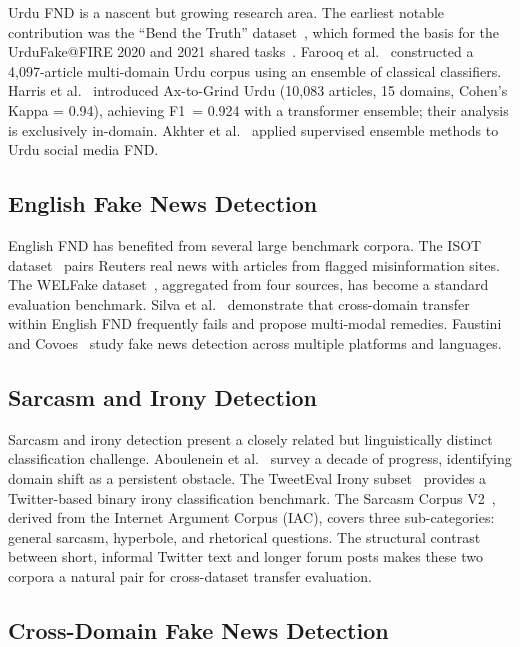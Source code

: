 \documentclass[conference]{IEEEtran}
\begin{document}
Urdu FND is a nascent but growing research area. The earliest notable
contribution was the ``Bend the Truth'' dataset~\cite{amjad2020bend},
which formed the basis for the UrduFake@FIRE 2020 and 2021 shared
tasks~\cite{amjad2020fire,amjad2022fire}. Farooq et
al.~\cite{farooq2023fake} constructed a 4,097-article multi-domain
Urdu corpus using an ensemble of classical classifiers. Harris et
al.~\cite{harris2024axtogrind} introduced Ax-to-Grind Urdu (10,083
articles, 15 domains, Cohen's Kappa = 0.94), achieving F1~= 0.924
with a transformer ensemble; their analysis is exclusively in-domain.
Akhter et al.~\cite{akhter2021supervised} applied supervised ensemble
methods to Urdu social media FND.

\subsection{English Fake News Detection}

English FND has benefited from several large benchmark corpora. The
ISOT dataset~\cite{ahmed2018isot} pairs Reuters real news with articles
from flagged misinformation sites. The WELFake
dataset~\cite{verma2021welfake}, aggregated from four sources, has
become a standard evaluation benchmark. Silva et
al.~\cite{silva2021embracing} demonstrate that cross-domain transfer
within English FND frequently fails and propose multi-modal remedies.
Faustini and Covoes~\cite{faustini2020fake} study fake news detection
across multiple platforms and languages.

\subsection{Sarcasm and Irony Detection}

Sarcasm and irony detection present a closely related but
linguistically distinct classification challenge. Aboulenein et
al.~\cite{aboulenein2022sarcasm} survey a decade of progress,
identifying domain shift as a persistent obstacle. The TweetEval
Irony subset~\cite{barbieri2020tweeteval,vanhee2018semeval} provides a
Twitter-based binary irony classification benchmark. The Sarcasm
Corpus V2~\cite{oraby2016sarcasm}, derived from the Internet Argument
Corpus (IAC), covers three sub-categories: general sarcasm, hyperbole,
and rhetorical questions. The structural contrast between short,
informal Twitter text and longer forum posts makes these two corpora a
natural pair for cross-dataset transfer evaluation.

\subsection{Cross-Domain Fake News Detection}
\end{document}

